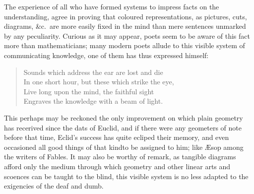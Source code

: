     The experience of all who have formed systems to impress facts on the 
    understanding, agree in proving that coloured representations, as 
    pictures, cuts, diagrams, \&c.~are more easily fixed in the mind than 
    mere sentences unmarked by any peculiarity. Curious as it may appear, 
    poets seem to be aware of this fact more than mathematicians; many modern 
    poets allude to this visible system of communicating knowledge, one of 
    them has thus expressed himself: 
    \begin{quotation}
        Sounds which address the ear are lost and die\\
        In one short hour, but these which strike the eye,\\
        Live long upon the mind, the faithful sight\\
        Engraves the knowledge with a beam of light.
    \end{quotation}
    This perhaps may be reckoned the only improvement on which plain 
    geometry has recerived since the dats of Euclid, and if there were any 
    geometers of note before that time, Eclid's success has quite ecliped 
    their memory, and even occasioned all good things of that kindto be 
    assigned to him; like \AE sop among the writers of Fables. It may also be 
    worthy of remark, as tangible diagrams afford only the medium through 
    which geometry and other linear arts and scoences can be taught to the 
    blind, this visible system is no less adapted to the exigencies of the 
    deaf and dumb. 

